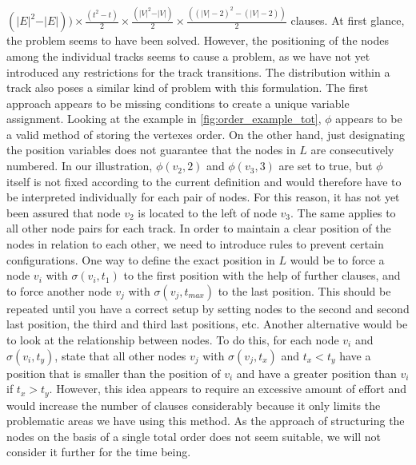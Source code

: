 \documentclass[bachelor, english]{algothesis}
\begin{document}
$ (\vert E \vert^2 - \vert E \vert)) \times \frac{(t^2-t)}{2} \times \frac{(\vert V \vert^2-\vert V \vert)}{2} \times \frac{((\vert V \vert-2)^2-(\vert V \vert-2))}{2}$ clauses.
\noindent \newline
At first glance, the problem seems to have been solved. However, the positioning of the nodes among the individual tracks seems to cause a problem, as we have not yet introduced any restrictions for the track transitions. The distribution within a track also poses a similar kind of problem with this formulation. The first approach appears to be missing conditions to create a unique variable assignment. Looking at the example in \cref{fig:order_example_tot}, $\phi$ appears to be a valid method of storing the vertexes order. On the other hand, just designating the position variables does not guarantee that the nodes in $L$ are consecutively numbered. In our illustration, $\phi(v_2,2)$ and $\phi(v_3,3)$ are set to true, but $\phi$ itself is not fixed according to the current definition and would therefore have to be interpreted individually for each pair of nodes. For this reason, it has not yet been assured that node $v_2$ is located to the left of node $v_3$.
The same applies to all other node pairs for each track. In order to maintain a clear position of the nodes in relation to each other, we need to introduce rules to prevent certain configurations. \newline
One way to define the exact position in $L$ would be to force a node $v_i$ with $\sigma(v_i,t_1)$ to the first position with the help of further clauses, and to force another node $v_j$ with $\sigma(v_j,t_{max})$ to the last position. This should be repeated until you have a correct setup by setting nodes to the second and second last position, the third and third last positions, etc. Another alternative would be to look at the relationship between nodes. To do this, for each node $v_i$ and $\sigma(v_i, t_y)$, state that all other nodes $v_j$ with $\sigma(v_j, t_x)$ and $t_x < t_y$ have a position that is smaller than the position of $v_i$ and have a greater position than $v_i$ if $t_x > t_y$. However, this idea appears to require an excessive amount of effort and would increase the number of clauses considerably because it only limits the problematic areas we have using this method. As the approach of structuring the nodes on the basis of a single total order does not seem suitable, we will not consider it further for the time being.
\end{document}
